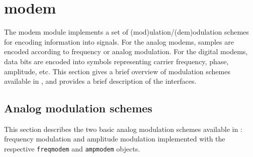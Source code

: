 % 
%

\newpage
\section{modem}
\label{module:modem}
The modem module implements a set of (mod)ulation/(dem)odulation schemes
for encoding information into signals.
For the analog modems, samples are encoded according to frequency or
analog modulation.
For the digital modems, data bits are encoded into symbols representing
carrier frequency, phase, amplitude, etc.
This section gives a brief overview of modulation schemes available in
\liquid, and provides a brief description of the interfaces.


%
%

\subsection{Analog modulation schemes}
\label{module:modem:analog}
This section describes the two basic analog modulation schemes available
in \liquid:
frequency modulation and amplitude modulation
implemented with the respective {\tt freqmodem} and {\tt ampmodem}
objects.

